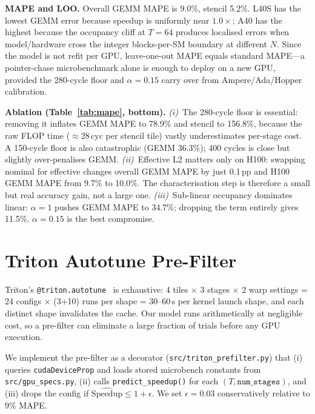 \documentclass[10pt,twocolumn]{article}
\begin{document}
\textbf{MAPE and LOO.} Overall GEMM MAPE is 9.0\%, stencil 5.2\%.
L40S has the lowest GEMM error because speedup is uniformly near
$1.0\times$; A40 has the highest because the occupancy cliff at
$T{=}64$ produces localised errors when model/hardware cross the
integer blocks-per-SM boundary at different $N$.  Since the model is not refit per GPU, leave-one-out MAPE equals
standard MAPE---a pointer-chase microbenchmark alone is enough to
deploy on a new GPU, provided the 280-cycle floor and
$\alpha{=}0.15$ carry over from Ampere/Ada/Hopper calibration.

\textbf{Ablation (Table~\ref{tab:mape}, bottom).}
\emph{(i)}~The 280-cycle floor is essential: removing it inflates
GEMM MAPE to 78.9\% and stencil to 156.8\%, because the raw FLOP
time ($\approx$28\,cyc per stencil tile) vastly underestimates
per-stage cost.  A 150-cycle floor is also catastrophic (GEMM
36.3\%); 400 cycles is close but slightly over-penalises GEMM.
\emph{(ii)}~Effective L2 matters only on H100: swapping nominal for
effective changes overall GEMM MAPE by just 0.1\,pp and H100 GEMM
MAPE from 9.7\% to 10.0\%.  The characterisation step is therefore
a small but real accuracy gain, not a large one.
\emph{(iii)}~Sub-linear occupancy dominates linear: $\alpha{=}1$
pushes GEMM MAPE to 34.7\%; dropping the term entirely gives
11.5\%.  $\alpha{=}0.15$ is the best compromise.

\section{Triton Autotune Pre-Filter}
\label{sec:triton}

Triton's \texttt{@triton.autotune}~\cite{triton} is exhaustive:
4 tiles $\times$ 3 stages $\times$ 2 warp settings = 24 configs
$\times$ (3+10) runs per shape = 30--60\,s per kernel launch shape,
and each distinct shape invalidates the cache.  Our model runs
arithmetically at negligible cost, so a pre-filter can eliminate a
large fraction of trials before any GPU execution.

We implement the pre-filter as a decorator
(\texttt{src/triton\_prefilter.py}) that (i) queries
\texttt{cudaDeviceProp} and loads stored microbench constants from
\texttt{src/gpu\_specs.py}, (ii) calls \texttt{predict\_speedup()}
for each $(T, \texttt{num\_stages})$, and (iii) drops the config if
$\widehat{\text{Speedup}} \leq 1 + \epsilon$.  We set
$\epsilon{=}0.03$ conservatively relative to 9\% MAPE.
\end{document}

